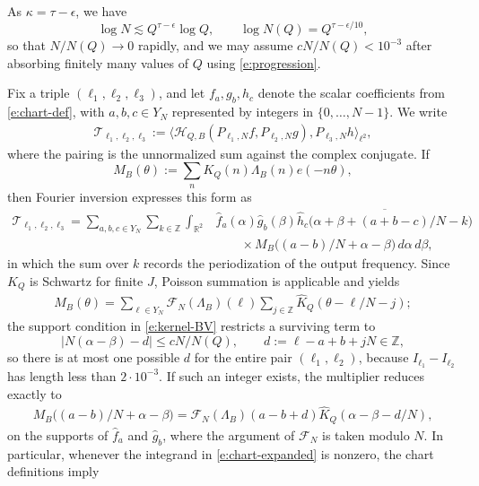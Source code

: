 \documentclass[12pt,leqno]{amsart}
\numberwithin{equation}{section}
\theoremstyle{definition}
\theoremstyle{plain}
\begin{document}
	As $\kappa=\tau-\epsilon$, we have
	\[
	\log N\lesssim Q^{\tau-\epsilon}\log Q,
	\qquad \log N(Q)=Q^{\tau-\epsilon/10},
	\]
	so that $N/N(Q)\to0$ rapidly, and we may assume $cN/N(Q)<10^{-3}$ after
	absorbing finitely many values of $Q$ using \eqref{e:progression}.
	
	Fix a triple $(\ell_1,\ell_2,\ell_3)$, and let
	$f_a,g_b,h_c$ denote the scalar coefficients from \eqref{e:chart-def},
	with $a,b,c\in Y_N$ represented by integers in $\{0,\ldots,N-1\}$.
	We write
	\begin{align}\label{e:QBform}
		\mathcal T_{\ell_1,\ell_2,\ell_3}
		:=\big\langle\mathcal H_{Q,B}(P_{\ell_1,N}f,P_{\ell_2,N}g),
		P_{\ell_3,N}h\big\rangle_{\ell^2},
	\end{align}
	where the pairing is the unnormalized sum against the complex conjugate.
	If
	\[
	M_B(\theta):=\sum_nK_Q(n)\Lambda_B(n)e(-n\theta),
	\]
	then Fourier inversion expresses this form as
	\begin{equation}\label{e:chart-expanded}
		\begin{split}
			\mathcal T_{\ell_1,\ell_2,\ell_3}
			=\sum_{a,b,c\in Y_N}\sum_{k\in\mathbb Z}
			\int_{\mathbb R^2}&\widehat f_a(\alpha)\widehat g_b(\beta)
			\overline{\widehat h_c\big(\alpha+\beta+(a+b-c)/N-k\big)}\\
			&\qquad\times M_B\big((a-b)/N+\alpha-\beta\big)
			\,d\alpha\,d\beta,
		\end{split}
	\end{equation}
	in which the sum over $k$ records the periodization of the output frequency.
	Since $K_Q$ is Schwartz for finite $J$, Poisson summation is applicable
	and yields
	\begin{align}\label{e:sampled-multiplier}
		M_B(\theta)
		=\sum_{\ell\in Y_N}\mathcal F_N(\Lambda_B)(\ell)
		\sum_{j\in\mathbb Z}\widehat K_Q(\theta-\ell/N-j);
	\end{align}
	the support condition in \eqref{e:kernel-BV} restricts a surviving term to
	\[
	|N(\alpha-\beta)-d|\leq cN/N(Q),\qquad
	d:=\ell-a+b+jN\in\mathbb Z,
	\]
	so there is at most one possible $d$ for the entire pair $(\ell_1,\ell_2)$, because $I_{\ell_1}-I_{\ell_2}$ has length less than $2\cdot10^{-3}$. If such an integer exists, the multiplier reduces exactly to
	\begin{align}\label{e:one-alias}
		M_B\big((a-b)/N+\alpha-\beta\big)
		=\mathcal F_N(\Lambda_B)(a-b+d)
		\widehat K_Q(\alpha-\beta-d/N),
	\end{align}
	on the supports of $\widehat f_a$ and $\widehat g_b$, where the argument of $\mathcal F_N$ is taken modulo $N$. In particular, whenever the integrand in \eqref{e:chart-expanded} is nonzero, the chart definitions imply
\end{document}
